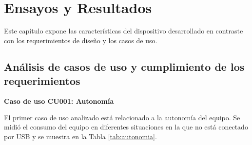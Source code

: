 
\chapter{Ensayos y Resultados} %

\label{Chapter4} %

Este capítulo expone las características del dispositivo desarrollado en contraste con los requerimientos de diseño y los casos de uso.

\section{Análisis de casos de uso y cumplimiento de los requerimientos}
\label{sec:pruebasHW}

\textbf{Caso de uso CU001: Autonomía}

El primer caso de uso analizado está relacionado a la autonomía del equipo. Se midió el consumo del equipo en diferentes situaciones en la que no está conectado por USB y se muestra en la Tabla \ref{tab:autonomia}.

